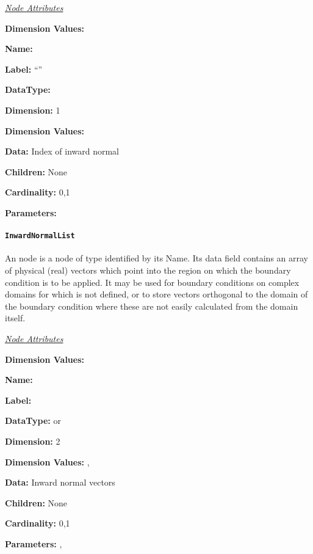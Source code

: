 \textit{\uline{Node Attributes}}
\begin{Ventryic}{\textbf{Dimension Values:}}
\item [\textbf{Name:}]
\item [\textbf{Label:}]
      ``''
\item [\textbf{DataType:}]
\item [\textbf{Dimension:}]
      1
\item [\textbf{Dimension Values:}]
\item [\textbf{Data:}]
      Index of inward normal
\item [\textbf{Children:}]
      None
\item [\textbf{Cardinality:}]
      0,1
\item [\textbf{Parameters:}]
\end{Ventryic}

\paragraph{\texttt{InwardNormalList}}

An  node is a node of type 
identified by its Name. Its data field contains an array of
physical (real) vectors which point into the region on which the
boundary condition is to be applied.  It may be used for boundary
conditions on complex domains for which  is not
defined, or to store vectors orthogonal to the domain of the boundary
condition where these are not easily calculated from the domain itself.

\textit{\uline{Node Attributes}}
\begin{Ventryic}{\textbf{Dimension Values:}}
\item [\textbf{Name:}]
\item [\textbf{Label:}]
\item [\textbf{DataType:}]
       or 
\item [\textbf{Dimension:}]
      2
\item [\textbf{Dimension Values:}]
      , 
\item [\textbf{Data:}]
      Inward normal vectors
\item [\textbf{Children:}]
      None
\item [\textbf{Cardinality:}]
      0,1
\item [\textbf{Parameters:}]
      , 
\end{Ventryic}


